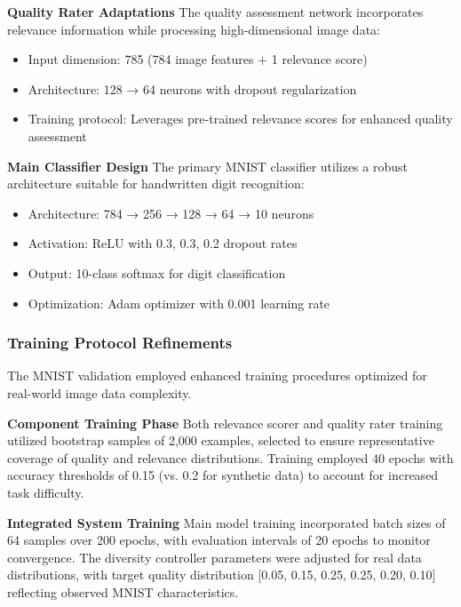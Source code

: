 \documentclass[12pt]{article}
\begin{document}
\textbf{Quality Rater Adaptations}
The quality assessment network incorporates relevance information while processing high-dimensional image data:

\begin{itemize}
\item Input dimension: 785 (784 image features + 1 relevance score)
\item Architecture: 128 → 64 neurons with dropout regularization
\item Training protocol: Leverages pre-trained relevance scores for enhanced quality assessment
\end{itemize}

\textbf{Main Classifier Design}
The primary MNIST classifier utilizes a robust architecture suitable for handwritten digit recognition:

\begin{itemize}
\item Architecture: 784 → 256 → 128 → 64 → 10 neurons
\item Activation: ReLU with 0.3, 0.3, 0.2 dropout rates
\item Output: 10-class softmax for digit classification
\item Optimization: Adam optimizer with 0.001 learning rate
\end{itemize}

\subsubsection{Training Protocol Refinements}\label{training-protocol}

The MNIST validation employed enhanced training procedures optimized for real-world image data complexity.

\textbf{Component Training Phase}
Both relevance scorer and quality rater training utilized bootstrap samples of 2,000 examples, selected to ensure representative coverage of quality and relevance distributions. Training employed 40 epochs with accuracy thresholds of 0.15 (vs. 0.2 for synthetic data) to account for increased task difficulty.

\textbf{Integrated System Training}
Main model training incorporated batch sizes of 64 samples over 200 epochs, with evaluation intervals of 20 epochs to monitor convergence. The diversity controller parameters were adjusted for real data distributions, with target quality distribution [0.05, 0.15, 0.25, 0.25, 0.20, 0.10] reflecting observed MNIST characteristics.
\end{document}
